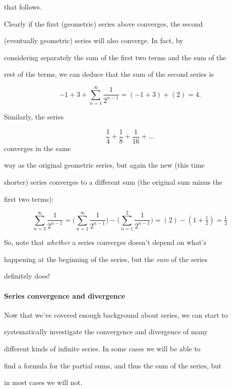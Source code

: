 that follows.



Clearly if the first (geometric) series above converges, the second

(eventually geometric) series will also converge. In fact, by

considering separately the sum of the first two terms and the sum of the

rest of the terms, we can deduce that the sum of the second series is



$$-1+3+\sum _{n=1}^{\infty} \frac{1}{2^{n-1}} = (-1+3)+(2) = 4.$$



Similarly, the series



$$\frac{1}{4}+\frac{1}{8}+\frac{1}{16}+\ldots$$ converges in the same

way as the original geometric series, but again the new (this time

shorter) series converges to a different sum (the original sum minus the

first two terms):



$$\sum _{n=3}^{\infty} \frac{1}{2^{n-1}} = \biggl(\sum _{n=1}^{\infty} \frac{1}{2^{n-1}}\biggr) - \biggl(\sum _{n=1}^2 \frac{1}{2^{n-1}}\biggr) = (2)-(1+\tfrac{1}{2}) = \tfrac{1}{2}$$



So, note that \textit{whether} a series converges doesn't depend on what's

happening at the beginning of the series, but the \textit{sum} of the series

definitely does!



\paragraph{Series convergence and divergence}



Now that we've covered enough background about series, we can start to

systematically investigate the convergence and divergence of many

different kinds of infinite series. In some cases we will be able to

find a formula for the partial sums, and thus the sum of the series, but

in most cases we will not.



